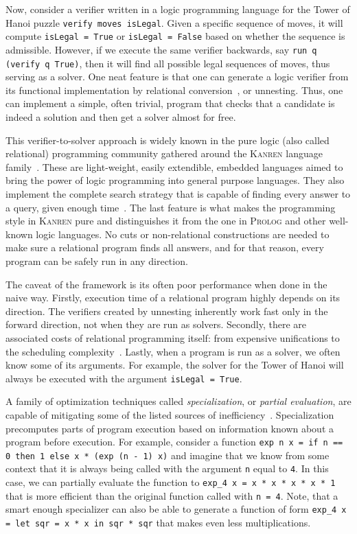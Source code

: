 Now, consider a verifier written in a logic programming language for the Tower of Hanoi puzzle \texttt{verify moves isLegal}. 
Given a specific sequence of moves, it will compute \texttt{isLegal = True} or \texttt{isLegal = False} based on whether the sequence is admissible. 
However, if we execute the same verifier backwards, say \texttt{run q (verify q True)}, then it will find all possible legal sequences of moves, thus serving as a solver. 
One neat feature is that one can generate a logic verifier from its functional implementation by relational conversion~\cite{lozov2018typed}, or unnesting. 
Thus, one can implement a simple, often trivial, program that checks that a candidate is indeed a solution and then get a solver almost for free. 

This verifier-to-solver approach is widely known in the pure logic (also called relational) programming community gathered around the \textsc{Kanren} language family~\cite{TheReasonedSchemer,byrd2017unified}. 
These are light-weight, easily extendible, embedded languages aimed to bring the power of logic programming into general purpose languages. 
They also implement the complete search strategy that is capable of finding every answer to a query, given enough time~\cite{kiselyov2005backtracking}.
The last feature is what makes the programming style in \textsc{Kanren} pure and distinguishes it from the one in \textsc{Prolog} and other well-known logic languages. 
No cuts or non-relational constructions are needed to make sure a relational program finds all answers, and for that reason, every program can be safely run in any direction. 

The caveat of the framework is its often poor performance when done in the naive way. 
Firstly, execution time  of a relational program highly depends on its direction. 
The verifiers created by unnesting inherently work fast only in the forward direction, not when they are run as solvers. 
Secondly, there are associated costs of relational programming itself: from expensive unifications to the scheduling complexity~\cite{rozplokhas2022scheduling}. 
Lastly, when a program is run as a solver, we often know some of its arguments. 
For example, the solver for the Tower of Hanoi will always be executed with the argument \texttt{isLegal = True}. 

A family of optimization techniques called \emph{specialization}, or \emph{partial evaluation}, are capable of mitigating some of the listed sources of inefficiency~\cite{de1999conjunctive,verbitskaia2021empirical}. 
Specialization precomputes parts of program execution based on information known about a program before execution. 
For example, consider a function \texttt{exp n x = if n == 0 then 1 else x * (exp (n - 1) x)} and imagine that we know from some context that it is always being called with the argument \texttt{n} equal to  \texttt{4}. 
In this case, we can partially evaluate the function to \texttt{exp\_4 x = x * x * x * x * 1} that is more efficient than the original function called with \texttt{n = 4}. 
Note, that a smart enough specializer can also be able to generate a function of form \texttt{exp\_4 x = let sqr = x * x in sqr * sqr} that makes even less multiplications. 


